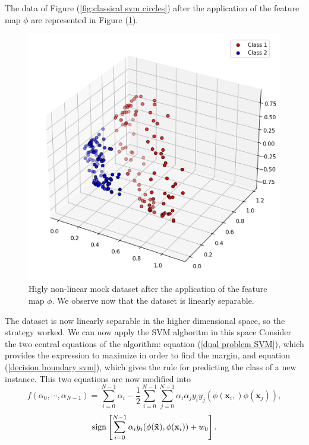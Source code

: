 \documentclass[a4paper]{article}
\begin{document}
The data of Figure (\ref{fig:classical svm circles}) after the application of the feature map $\phi$ are represented in Figure (\ref{fig:classical svm circle 3d}). 
\begin{figure}[h!]
    \centering
    \includegraphics[width=\textwidth]{images/circles3d.png}
    \caption{Higly non-linear mock dataset after the application of the feature map $\phi$. We observe now that the dataset is linearly separable.}
    \label{fig:classical svm circle 3d}
\end{figure}
The dataset is now linearly separable in the higher dimensional space, so the strategy worked. We can now apply the SVM alghoritm in this space Consider the two central equations of the algorithm: equation (\ref{dual problem SVM}), which provides the expression to maximize in order to find the margin, and equation (\ref{decision boundary svm}), which gives the rule for predicting the class of a new instance. This two equations are now modified into 
\begin{equation}
    f(\alpha_0,\cdots,\alpha_{N-1})=\sum_{i=0}^{N-1} \alpha_i-\frac{1}{2}\sum_{i=0}^{N-1}\sum_{j=0}^{N-1}\alpha_i\alpha_jy_iy_j(\phi(\mathbf{x}_i,)\phi(\mathbf{x}_j)),
    \label{kernel max}
\end{equation}
\begin{equation}
    \textup{sign}\left[\sum_{i=0}^{N-1}\alpha_iy_i(\phi(\mathbf{\tilde{x}}), \phi(\mathbf{x}_i))+w_0\right].
    \label{kernel prodiction}
\end{equation}
\end{document}
